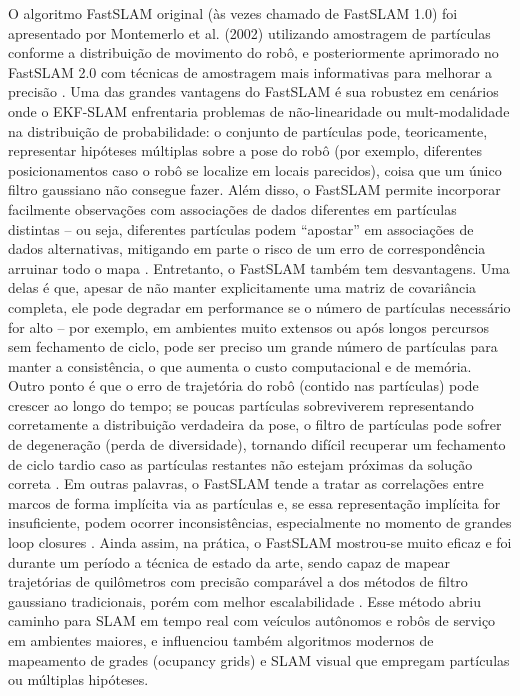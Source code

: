         O algoritmo FastSLAM original (às vezes chamado de FastSLAM 1.0) foi apresentado por Montemerlo et al. (2002) utilizando amostragem de partículas conforme a distribuição de movimento do robô, e posteriormente aprimorado no FastSLAM 2.0 com técnicas de amostragem mais informativas para melhorar a precisão \cite{Montemerlo2002}. Uma das grandes vantagens do FastSLAM é sua robustez em cenários onde o EKF-SLAM enfrentaria problemas de não-linearidade ou mult-modalidade na distribuição de probabilidade: o conjunto de partículas pode, teoricamente, representar hipóteses múltiplas sobre a pose do robô (por exemplo, diferentes posicionamentos caso o robô se localize em locais parecidos), coisa que um único filtro gaussiano não consegue fazer. Além disso, o FastSLAM permite incorporar facilmente observações com associações de dados diferentes em partículas distintas – ou seja, diferentes partículas podem “apostar” em associações de dados alternativas, mitigando em parte o risco de um erro de correspondência arruinar todo o mapa \cite{Thrun2005}. Entretanto, o FastSLAM também tem desvantagens. Uma delas é que, apesar de não manter explicitamente uma matriz de covariância completa, ele pode degradar em performance se o número de partículas necessário for alto – por exemplo, em ambientes muito extensos ou após longos percursos sem fechamento de ciclo, pode ser preciso um grande número de partículas para manter a consistência, o que aumenta o custo computacional e de memória. Outro ponto é que o erro de trajetória do robô (contido nas partículas) pode crescer ao longo do tempo; se poucas partículas sobreviverem representando corretamente a distribuição verdadeira da pose, o filtro de partículas pode sofrer de degeneração (perda de diversidade), tornando difícil recuperar um fechamento de ciclo tardio caso as partículas restantes não estejam próximas da solução correta \cite{Thrun2005}. Em outras palavras, o FastSLAM tende a tratar as correlações entre marcos de forma implícita via as partículas e, se essa representação implícita for insuficiente, podem ocorrer inconsistências, especialmente no momento de grandes loop closures \cite{Thrun2005}. Ainda assim, na prática, o FastSLAM mostrou-se muito eficaz e foi durante um período a técnica de estado da arte, sendo capaz de mapear trajetórias de quilômetros com precisão comparável a dos métodos de filtro gaussiano tradicionais, porém com melhor escalabilidade \cite{Thrun2005}. Esse método abriu caminho para SLAM em tempo real com veículos autônomos e robôs de serviço em ambientes maiores, e influenciou também algoritmos modernos de mapeamento de grades (ocupancy grids) e SLAM visual que empregam partículas ou múltiplas hipóteses.
        
